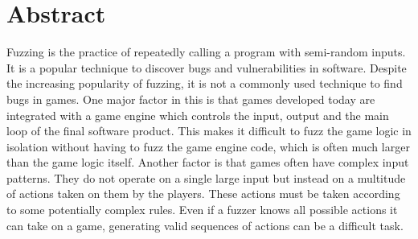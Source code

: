 \documentclass{Configuration_Files/PoliMi3i_thesis}
\begin{document}


\pagestyle{empty} %
\frontmatter %


\pagebreak

\startpreamble
\setcounter{page}{1} %

\chapter*{Abstract} 
Fuzzing is the practice of repeatedly calling a program with semi-random inputs.
It is a popular technique to discover bugs and vulnerabilities in software.
Despite the increasing popularity of fuzzing, it is not a commonly used technique to find bugs in games.
One major factor in this is that games developed today are integrated with a game engine which controls the input, output and the main loop of the final software product.
This makes it difficult to fuzz the game logic in isolation without having to fuzz the game engine code, which is often much larger than the game logic itself.
Another factor is that games often have complex input patterns. They do not operate on a single large input but instead on a multitude of actions taken on them by the players.
These actions must be taken according to some potentially complex rules.
Even if a fuzzer knows all possible actions it can take on a game, generating valid sequences of actions can be a difficult task.
\end{document}
